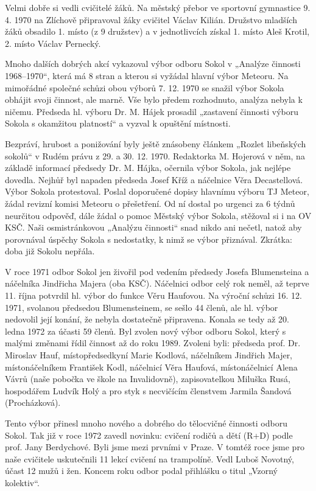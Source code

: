 Velmi dobře si vedli cvičitelé žáků. Na městský přebor ve sportovní
gymnastice 9. 4. 1970 na Zlíchově připravoval žáky cvičitel Václav
Kilián. Družstvo mladších žáků obsadilo 1. místo (z 9 družstev) a v
jednotlivcích získal 1. místo Aleš Krotil, 2. místo Václav Pernecký.

Mnoho dalších dobrých akcí vykazoval výbor odboru Sokol v „Analýze
činnosti 1968--1970``, která má 8 stran a kterou si vyžádal hlavní výbor
Meteoru. Na mimořádné společné schůzi obou výborů 7. 12. 1970 se snažil
výbor Sokola obhájit svoji činnost, ale marně. Vše bylo předem
rozhodnuto, analýza nebyla k ničemu. Předseda hl. výboru Dr. M. Hájek
prosadil „zastavení činnosti výboru Sokola s okamžitou platností`` a
vyzval k opuštění místnosti.

Bezpráví, hrubost a ponižování byly ještě znásobeny článkem „Rozlet
libeňských sokolů`` v Rudém právu z 29. a 30. 12. 1970. Redaktorka M.
Hojerová v něm, na základě informací předsedy Dr. M. Hájka, očernila
výbor Sokola, jak nejlépe dovedla. Nejhůř byl napaden předseda Josef
Kříž a náčelnice Věra Decastellová. Výbor Sokola protestoval. Poslal
doporučené dopisy hlavnímu výboru TJ Meteor, žádal revizní komisi
Meteoru o přešetření. Od ní dostal po urgenci za 6 týdnů neurčitou
odpověď, dále žádal o pomoc Městský výbor Sokola, stěžoval si i na OV
KSČ. Naši osmistránkovou „Analýzu činnosti`` snad nikdo ani nečetl,
natož aby porovnával úspěchy Sokola s nedostatky, k nimž se výbor
přiznával. Zkrátka: doba již Sokolu nepřála.

V roce 1971 odbor Sokol jen živořil pod vedením předsedy Josefa
Blumensteina a náčelníka Jindřicha Majera (oba KSČ). Náčelnici odbor
celý rok neměl, až teprve 11. října potvrdil hl. výbor do funkce Věru
Haufovou. Na výroční schůzi 16. 12. 1971, svolanou předsedou
Blumensteinem, se sešlo 44 členů, ale hl. výbor nedovolil její konání,
že nebyla dostatečně připravena. Konala se tedy až 20. ledna 1972 za
účasti 59 členů. Byl zvolen nový výbor odboru Sokol, který s malými
změnami řídil činnost až do roku 1989. Zvoleni byli: předseda prof. Dr.
Miroslav Hauf, místopředsedkyní Marie Kodlová, náčelníkem Jindřich
Majer, místonáčelníkem František Kodl, náčelnicí Věra Haufová,
místonáčelnicí Alena Vávrů (naše pobočka ve škole na Invalidovně),
zapisovatelkou Miluška Rusá, hospodářem Ludvík Holý a pro styk s
necvičícím členstvem Jarmila Šandová (Procházková).

Tento výbor přinesl mnoho nového a dobrého do tělocvičné činnosti odboru
Sokol. Tak již v roce 1972 zavedl novinku: cvičení rodičů a dětí (R+D)
podle prof. Jany Berdychové. Byli jsme mezi prvními v Praze. V tomtéž
roce jsme pro naše cvičitele uskutečnili 11 lekcí cvičení na trampolíně.
Vedl Luboš Novotný, účast 12 mužů i žen. Koncem roku odbor podal
přihlášku o titul „Vzorný kolektiv``.

